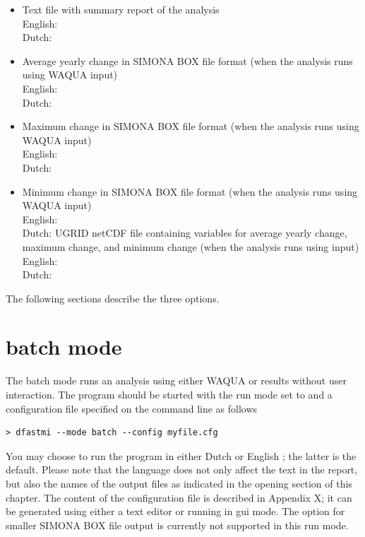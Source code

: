 \begin{itemize}
\item Text file with summary report of the analysis \\
English:  \\
Dutch: 
\item Average yearly change in SIMONA BOX file format (when the analysis runs using WAQUA input) \\
English:  \\
Dutch: 
\item Maximum change in SIMONA BOX file format (when the analysis runs using WAQUA input) \\
English:  \\
Dutch: 
\item Minimum change in SIMONA BOX file format (when the analysis runs using WAQUA input) \\
English:  \\
Dutch: 
UGRID netCDF file containing variables for average yearly change, maximum change, and minimum change (when the analysis runs using \dflowfm input) \\
English:  \\
Dutch: 
\end{itemize}

The following sections describe the three options.

\section{batch mode}

The batch mode runs an analysis using either WAQUA or \dflowfm results without user interaction.
The program should be started with the run mode set to  and a configuration file specified on the command line as follows

\begin{Verbatim}
> dfastmi --mode batch --config myfile.cfg
\end{Verbatim}

You may choose to run the program in either Dutch  or English ; the latter is the default.
Please note that the language does not only affect the text in the report, but also the names of the output files as indicated in the opening section of this chapter.
The content of the configuration file is described in Appendix X; it can be generated using either a text editor or \dfastmi running in gui mode.
The  option for smaller SIMONA BOX file output is currently not supported in this run mode.


